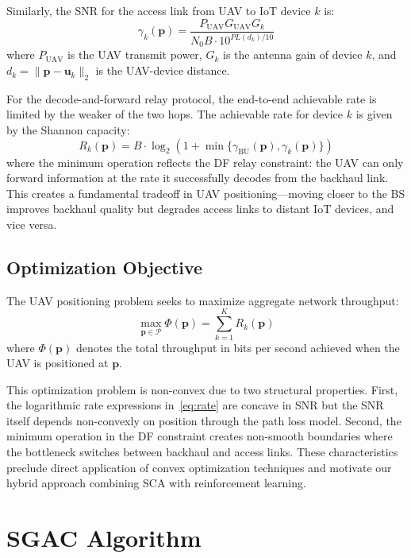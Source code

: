 \documentclass[journal]{IEEEtran}
\begin{document}
Similarly, the SNR for the access link from UAV to IoT device $k$ is:
\begin{equation}
\gamma_k(\mathbf{p}) = \frac{P_{\text{UAV}} G_{\text{UAV}} G_k}{N_0 B \cdot 10^{PL(d_k)/10}}
\label{eq:snr_k}
\end{equation}
where $P_{\text{UAV}}$ is the UAV transmit power, $G_k$ is the antenna gain of device $k$, and $d_k = \|\mathbf{p} - \mathbf{u}_k\|_2$ is the UAV-device distance.

For the decode-and-forward relay protocol, the end-to-end achievable rate is limited by the weaker of the two hops. The achievable rate for device $k$ is given by the Shannon capacity:
\begin{equation}
R_k(\mathbf{p}) = B \cdot \log_2\left(1 + \min\{\gamma_{\text{BU}}(\mathbf{p}), \gamma_{k}(\mathbf{p})\}\right)
\label{eq:rate}
\end{equation}
where the minimum operation reflects the DF relay constraint: the UAV can only forward information at the rate it successfully decodes from the backhaul link. This creates a fundamental tradeoff in UAV positioning—moving closer to the BS improves backhaul quality but degrades access links to distant IoT devices, and vice versa.

\subsection{Optimization Objective}

The UAV positioning problem seeks to maximize aggregate network throughput:
\begin{equation}
\max_{\mathbf{p} \in \mathcal{P}} \Phi(\mathbf{p}) = \sum_{k=1}^{K} R_k(\mathbf{p})
\label{eq:objective}
\end{equation}
where $\Phi(\mathbf{p})$ denotes the total throughput in bits per second achieved when the UAV is positioned at $\mathbf{p}$.

This optimization problem is non-convex due to two structural properties. First, the logarithmic rate expressions in~\eqref{eq:rate} are concave in SNR but the SNR itself depends non-convexly on position through the path loss model. Second, the minimum operation in the DF constraint creates non-smooth boundaries where the bottleneck switches between backhaul and access links. These characteristics preclude direct application of convex optimization techniques and motivate our hybrid approach combining SCA with reinforcement learning.

\section{SGAC Algorithm}
\end{document}

